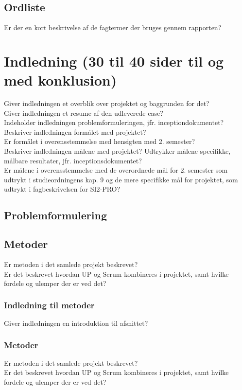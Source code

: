 \documentclass[12pt]{article}
\begin{document}
\subsection{Ordliste}
Er der en kort beskrivelse af de fagtermer der bruges gennem rapporten?

\section{Indledning (30 til 40 sider til og med konklusion)}

Giver indledningen et overblik over projektet og baggrunden for det?\\
Giver indledningen et resume af den udleverede case?\\
Indeholder indledningen problemformuleringen, jfr. inceptiondokumentet?\\
Beskriver indledningen formålet med projektet?\\ Er formålet i overensstemmelse med hensigten med 2. semester? \\
Beskriver indledningen målene med projektet? Udtrykker målene specifikke, målbare resultater, jfr. inceptionsdokumentet? \\
Er målene i overensstemmelse med de overordnede mål for 2. semester som udtrykt i studieordningens kap. 9 og de mere specifikke mål for projektet, som udtrykt i fagbeskrivelsen for SI2-PRO?

\subsection{Problemformulering}

\subsection{Metoder}
Er metoden i det samlede projekt beskrevet?\\
Er det beskrevet hvordan UP og Scrum kombineres i projektet, samt hvilke fordele og ulemper der er ved det?\\

\subsubsection{Indledning til metoder}
Giver indledningen en introduktion til  afsnittet?\\
\subsubsection{Metoder}
Er metoden i det samlede projekt beskrevet?\\
Er det beskrevet hvordan UP og Scrum kombineres i projektet, samt hvilke fordele og ulemper der er ved det?\\
\end{document}
